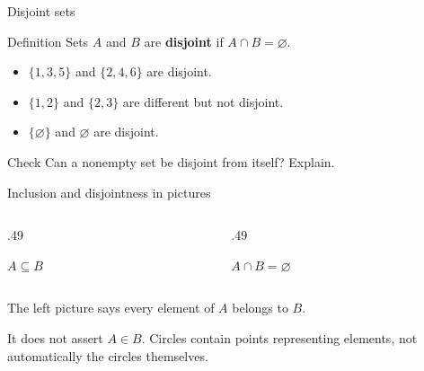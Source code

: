 \documentclass{beamer}
\begin{document}
\begin{frame}{Disjoint sets}
\begin{block}{Definition}
Sets $A$ and $B$ are \textbf{disjoint} if $A\cap B=\varnothing$.
\end{block}\begin{itemize}
\item $\{1,3,5\}$ and $\{2,4,6\}$ are disjoint.
\item $\{1,2\}$ and $\{2,3\}$ are different but not disjoint.
\item $\{\varnothing\}$ and $\varnothing$ are disjoint.
\end{itemize}\begin{block}{Check}
Can a nonempty set be disjoint from itself? Explain.
\end{block}
\end{frame}
\begin{frame}{Inclusion and disjointness in pictures}
\begin{columns}[T]
\begin{column}{.49\textwidth}\centering
{}\par $A\subseteq B$
\end{column}
\begin{column}{.49\textwidth}\centering
{}\par $A\cap B=\varnothing$
\end{column}\end{columns}
\medskip The left picture says every element of $A$ belongs to $B$.
\medskip\par It does not assert $A\in B$. Circles contain points representing elements, not automatically the circles themselves.
\end{frame}
\end{document}
